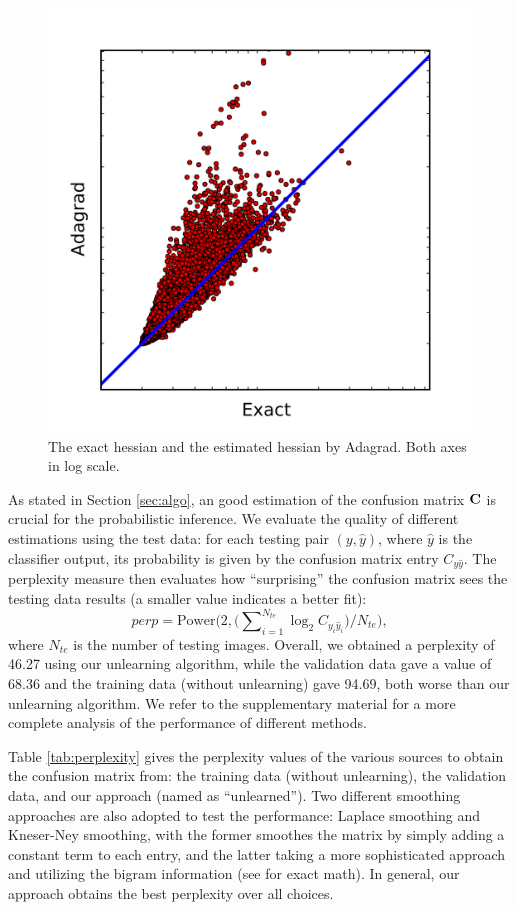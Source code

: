 \begin{figure}
    \centering
    \includegraphics[width=0.5\linewidth]{figs/taskadaptation/hessian_comparison.png}
    \caption{The exact hessian and the estimated hessian by Adagrad. Both axes in log scale.}\label{fig:hessian}
\end{figure}

As stated in Section \ref{sec:algo}, an good estimation of the confusion matrix $\mathbf{C}$ is crucial for the probabilistic inference. We evaluate the quality of different estimations using the test data: for each testing pair $(y, \hat{y})$, where $\hat{y}$ is the classifier output, its probability is given by the confusion matrix entry $C_{y\hat{y}}$. The perplexity measure \cite{jurafsky2000speech} then evaluates how ``surprising'' the confusion matrix sees the testing data results (a smaller value indicates a better fit):
$$
perp = \mathrm{Power}\Big(2, \big(\sum\nolimits_{i=1}^{N_{te}}\log_{2}C_{y_i\hat{y}_i}\big)/N_{te}\Big),
$$
where $N_{te}$ is the number of testing images. Overall, we obtained a perplexity of 46.27 using our unlearning algorithm, while the validation data gave a value of 68.36 and the training data (without unlearning) gave 94.69, both worse than our unlearning algorithm. We refer to the supplementary material for a more complete analysis of the performance of different methods.

Table \ref{tab:perplexity} gives the perplexity values of the various sources to obtain the confusion matrix from: the training data (without unlearning), the validation data, and our approach (named as ``unlearned''). Two different smoothing approaches are also adopted to test the performance: Laplace smoothing and Kneser-Ney smoothing, with the former smoothes the matrix by simply adding a constant term to each entry, and the latter taking a more sophisticated approach and utilizing the bigram information (see \cite{jurafsky2000speech} for exact math). In general, our approach obtains the best perplexity over all choices.

